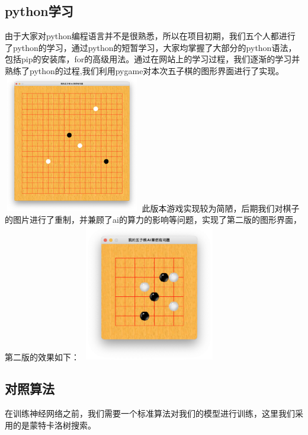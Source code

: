 \documentclass[a4paper]{article}
\begin{document}
\begin{multicols}{2}
    \subsection{python学习}
    由于大家对python编程语言并不是很熟悉，所以在项目初期，我们五个人都进行了python的学习\cite{ref3}，通过python的短暂学习，大家均掌握了大部分的python语法，包括pip的安装库，for的高级用法。通过在网站上的学习过程，我们逐渐的学习并熟练了python的过程,我们利用pygame对本次五子棋的图形界面进行了实现。
    \includegraphics[width=6cm,height=6cm]{gamepic.png}
    此版本游戏实现较为简陋，后期我们对棋子的图片进行了重制，并兼顾了ai的算力的影响等问题，实现了第二版的图形界面，第二版的效果如下：
    \includegraphics[width=6cm,height=6cm]{game.png}
    \subsection{对照算法}
在训练神经网络之前，我们需要一个标准算法对我们的模型进行训练，这里我们采用的是蒙特卡洛树搜索。

\end{multicols}
\end{document}
